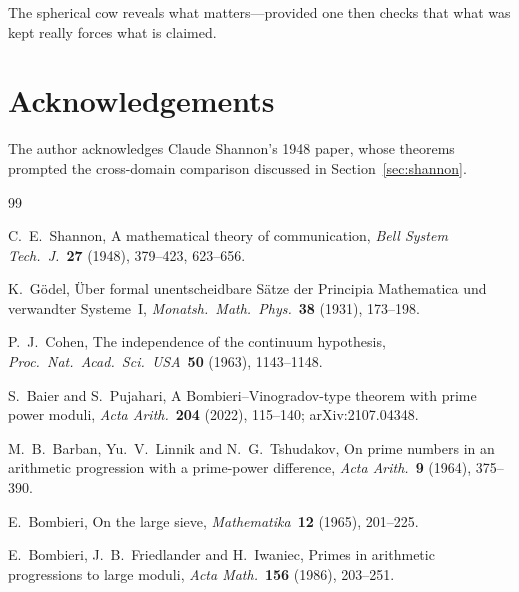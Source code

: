 \documentclass[12pt]{amsart}
\theoremstyle{plain}
\theoremstyle{definition}
\theoremstyle{remark}
\begin{document}
The spherical cow reveals what matters---provided one then checks that what was
kept really forces what is claimed.

\section*{Acknowledgements}

The author acknowledges Claude Shannon's 1948 paper, whose theorems prompted the
cross-domain comparison discussed in Section~\ref{sec:shannon}.

\begin{thebibliography}{99}


C.~E.~Shannon,
A mathematical theory of communication,
\emph{Bell System Tech.\ J.}\ \textbf{27} (1948), 379--423, 623--656.

K.~G\"odel,
\"Uber formal unentscheidbare S\"atze der Principia Mathematica und verwandter
Systeme~I,
\emph{Monatsh.\ Math.\ Phys.}\ \textbf{38} (1931), 173--198.

P.~J.~Cohen,
The independence of the continuum hypothesis,
\emph{Proc.\ Nat.\ Acad.\ Sci.\ USA}\ \textbf{50} (1963), 1143--1148.


S.~Baier and S.~Pujahari,
A Bombieri--Vinogradov-type theorem with prime power moduli,
\emph{Acta Arith.}\ \textbf{204} (2022), 115--140; arXiv:2107.04348.

M.~B.~Barban, Yu.~V.~Linnik and N.~G.~Tshudakov,
On prime numbers in an arithmetic progression with a prime-power difference,
\emph{Acta Arith.}\ \textbf{9} (1964), 375--390.

E.~Bombieri,
On the large sieve,
\emph{Mathematika}\ \textbf{12} (1965), 201--225.

E.~Bombieri, J.~B.~Friedlander and H.~Iwaniec,
Primes in arithmetic progressions to large moduli,
\emph{Acta Math.}\ \textbf{156} (1986), 203--251.


\end{thebibliography}
\end{document}

